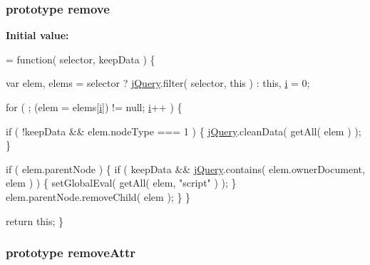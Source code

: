 \subsubsection[{remove}]{ {\bf prototype} remove}\label{jquery-1_810_82-vsdoc_8js_a2bed23308c25c53346bbe769c1f6f9a5}
{\bfseries Initial value\+:}
\begin{DoxyCode}
= \textcolor{keyword}{function}( selector, keepData ) \{


        var elem,
            elems = selector ? \hyperlink{jquery-1_810_82-vsdoc_8js_add5237586d970a38a81f990e8eb28c6c}{jQuery}.filter( selector, \textcolor{keyword}{this} ) : \textcolor{keyword}{this},
            \hyperlink{_bibabook_2_scripts_2respond_8min_8js_a5e25b1d1bed9ab5f3174b76d6a722180}{i} = 0;

        \textcolor{keywordflow}{for} ( ; (elem = elems[\hyperlink{_bibabook_2_scripts_2respond_8min_8js_a5e25b1d1bed9ab5f3174b76d6a722180}{i}]) != null; \hyperlink{_bibabook_2_scripts_2respond_8min_8js_a5e25b1d1bed9ab5f3174b76d6a722180}{i}++ ) \{

            \textcolor{keywordflow}{if} ( !keepData && elem.nodeType === 1 ) \{
                \hyperlink{jquery-1_810_82-vsdoc_8js_add5237586d970a38a81f990e8eb28c6c}{jQuery}.cleanData( getAll( elem ) );
            \}

            \textcolor{keywordflow}{if} ( elem.parentNode ) \{
                \textcolor{keywordflow}{if} ( keepData && \hyperlink{jquery-1_810_82-vsdoc_8js_add5237586d970a38a81f990e8eb28c6c}{jQuery}.contains( elem.ownerDocument, elem ) ) \{
                    setGlobalEval( getAll( elem, \textcolor{stringliteral}{"script"} ) );
                \}
                elem.parentNode.removeChild( elem );
            \}
        \}

        \textcolor{keywordflow}{return} \textcolor{keyword}{this};
    \}
\end{DoxyCode}
\hypertarget{jquery-1_810_82-vsdoc_8js_a1bd34fb2dc2e5231033df1cff8376a17}{}
\subsubsection[{remove\+Attr}]{ {\bf prototype} remove\+Attr}\label{jquery-1_810_82-vsdoc_8js_a1bd34fb2dc2e5231033df1cff8376a17}
\hypertarget{jquery-1_810_82-vsdoc_8js_a7cb7158f409485c170580c2afea3e234}{}
